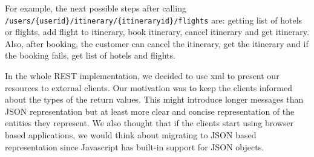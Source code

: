 For example, the next possible steps after calling\\ \texttt{/users/\{userid\}/itinerary/\{itineraryid\}/flights} are: getting list of hotels or flights, add flight to itinerary, book itinerary, cancel itinerary and get itinerary. Also, after booking, the customer can cancel the itinerary, get the itinerary and if the booking fails, get list of hotels and flights.

In the whole REST implementation, we decided to use xml to present our resources to external clients. Our motivation was to keep the clients informed about the types of the return values. This might introduce longer messages than JSON representation but at least more clear and concise representation of the entities they represent. We also thought that if the clients start using browser based applications, we would think about migrating to JSON based representation since Javascript has built-in support for JSON objects.


